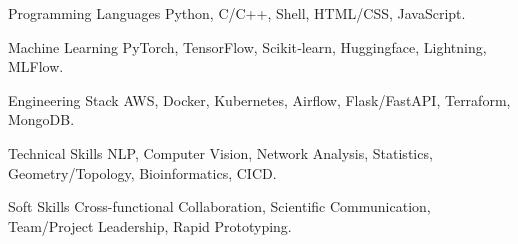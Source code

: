 

\begin{cvskills}

  \cvskill
    {Programming Languages} %
    {Python, C/C++, Shell, HTML/CSS, JavaScript.} %

  \cvskill
    {Machine Learning} %
    {PyTorch, TensorFlow, Scikit‑learn, Huggingface, Lightning, MLFlow.} %

  \cvskill
    {Engineering Stack} %
    {AWS, Docker, Kubernetes, Airflow, Flask/FastAPI, Terraform, MongoDB.} %
    
  \cvskill
    {Technical Skills} %
    {NLP, Computer Vision, Network Analysis, Statistics, Geometry/Topology, Bioinformatics, CICD.} %

  \cvskill
    {Soft Skills} %
    {Cross-functional Collaboration, Scientific Communication, Team/Project Leadership, Rapid Prototyping.} %

\end{cvskills}

